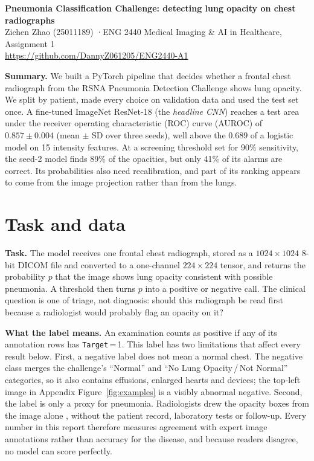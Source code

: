 \documentclass[11pt,a4paper]{article}
\newcommand{\repourl}{https://github.com/DannyZ061205/ENG2440-A1}
\begin{document}
\begin{center}
{\Large\bfseries Pneumonia Classification Challenge: detecting lung opacity on chest radiographs}\\[3pt]
Zichen Zhao (25011189) \quad·\quad ENG 2440 Medical Imaging \& AI in Healthcare, Assignment 1\\[1pt]
\url{\repourl}
\end{center}

\noindent\textbf{Summary.} We built a PyTorch pipeline that decides whether a frontal chest radiograph from the RSNA
Pneumonia Detection Challenge shows lung opacity. We split by patient, made every choice on validation data and used the test set once. A fine-tuned ImageNet ResNet-18 (the \emph{headline CNN}) reaches a test area under the receiver
operating characteristic (ROC) curve (AUROC) of $0.857 \pm 0.004$ (mean $\pm$ SD over three seeds), well above the $0.689$ of
a logistic model on 15 intensity features. At a screening threshold set for 90\% sensitivity, the seed-2 model finds 89\% of the opacities, but
only 41\% of its alarms are correct. Its probabilities also need recalibration, and part of its ranking appears to come
from the image projection rather than from the lungs.

\section{Task and data}
\textbf{Task.} The model receives one frontal chest radiograph, stored as a $1024\times1024$ 8-bit DICOM file and
converted to a one-channel $224\times224$ tensor, and returns the probability $p$ that the image shows lung opacity
consistent with possible pneumonia. A threshold then turns $p$ into a positive or negative call. The clinical question is one of triage, not diagnosis: should this radiograph be read first because a radiologist would probably flag an opacity on it?

\textbf{What the label means.} An examination counts as positive if any of its annotation rows has \texttt{Target}\,=\,1.
This label has two limitations that affect every result below. First, a negative label does not mean a normal chest. The
negative class merges the challenge's ``Normal'' and ``No Lung Opacity\,/\,Not Normal'' categories, so it also contains
effusions, enlarged hearts and devices; the top-left image in Appendix Figure~\ref{fig:examples} is a visibly abnormal
negative. Second, the label is only a proxy for pneumonia. Radiologists drew the opacity boxes from the image alone
\cite{shih2019}, without the patient record, laboratory tests or follow-up. Every number in this report therefore measures
agreement with expert image annotations rather than accuracy for the disease, and because readers disagree, no model can score perfectly.
\end{document}
